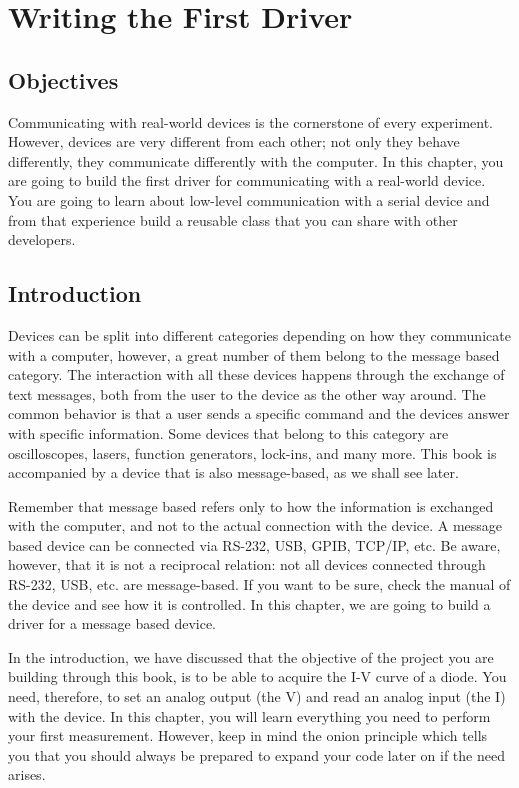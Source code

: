 \chapter{Writing the First Driver}
\section{Objectives}
Communicating with real-world devices is the cornerstone of every
experiment. However, devices are very different from each other; not
only they behave differently, they communicate differently with the
computer. In this chapter, you are going to build the first driver for
communicating with a real-world device. You are going to learn about
low-level communication with a serial device and from that experience
build a reusable class that you can share with other developers.

\section{Introduction}
Devices can be split into different categories depending on how they
communicate with a computer, however, a great number of them belong to
the message based category. The interaction with all these devices
happens through the exchange of text messages, both from the user to the
device as the other way around. The common behavior is that a user sends
a specific command and the devices answer with specific information.
Some devices that belong to this category are oscilloscopes, lasers,
function generators, lock-ins, and many more. This book is accompanied
by a device that is also message-based, as we shall see later.

Remember that message based refers only to how the information is
exchanged with the computer, and not to the actual connection with the
device. A message based device can be connected via RS-232, USB,
GPIB, TCP/IP, etc. Be aware, however, that it is not a reciprocal
relation: not all devices connected through RS-232, USB, etc. are
message-based. If you want to be sure, check the manual of the device
and see how it is controlled. In this chapter, we are going to build a
driver for a message based device.

In the introduction, we have discussed that the objective of the project
you are building through this book, is to be able to acquire the I-V
curve of a diode. You need, therefore, to set an analog output (the V)
and read an analog input (the I) with the device. In this chapter, you
will learn everything you need to perform your first measurement.
However, keep in mind the onion principle which tells you that you
should always be prepared to expand your code later on if the
need arises.

